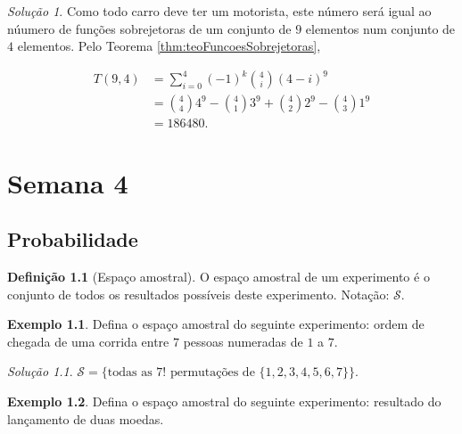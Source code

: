 \documentclass[]{book}
\theoremstyle{definition}
\newtheorem{definition}{Definição}[chapter]
\theoremstyle{definition}
\newtheorem{example}{Exemplo}[chapter]
\theoremstyle{definition}
\theoremstyle{remark}
\newtheorem*{solution}{Solução}
\begin{document}
\begin{solution}
\iffalse{} {Solução. } \fi{}Como todo carro deve ter um motorista, este número será igual ao núumero de funções sobrejetoras de um conjunto de \(9\) elementos num conjunto de \(4\) elementos.
Pelo Teorema \ref{thm:teoFuncoesSobrejetoras},

\begin{align}
T(9,4) &= \sum_{i=0}^{4}(-1)^k{4 \choose i}(4-i)^9 \\
&= {4 \choose 4} 4^9 - {4 \choose 1} 3^9 + {4 \choose 2} 2^9- {4 \choose 3} 1^9\\
&= 186480.
\end{align}
\end{solution}

\hypertarget{sem4}{%
\chapter{Semana 4}\label{sem4}}

\hypertarget{probabilidade}{%
\section{Probabilidade}\label{probabilidade}}

\begin{definition}[Espaço amostral]
\protect\hypertarget{def:defEspAmostral}{}{\label{def:defEspAmostral} \iffalse (Espaço amostral) \fi{} }O espaço amostral de um experimento é o conjunto de todos os resultados possíveis deste experimento.
Notação: \(\mathcal{S}.\)
\end{definition}

\begin{example}
\protect\hypertarget{exm:exCorrida}{}{\label{exm:exCorrida} }Defina o espaço amostral do seguinte experimento: ordem de chegada de uma corrida entre \(7\) pessoas numeradas de \(1\) a \(7\).
\end{example}

\begin{solution}
\iffalse{} {Solução. } \fi{}\(\mathcal{S}=\{\text{todas as $7!$ permutações de $\{1,2,3,4,5,6,7\}$}\}.\)
\end{solution}

\begin{example}
\protect\hypertarget{exm:exDuasMoedas}{}{\label{exm:exDuasMoedas} }Defina o espaço amostral do seguinte experimento: resultado do lançamento de duas moedas.
\end{example}
\end{document}
